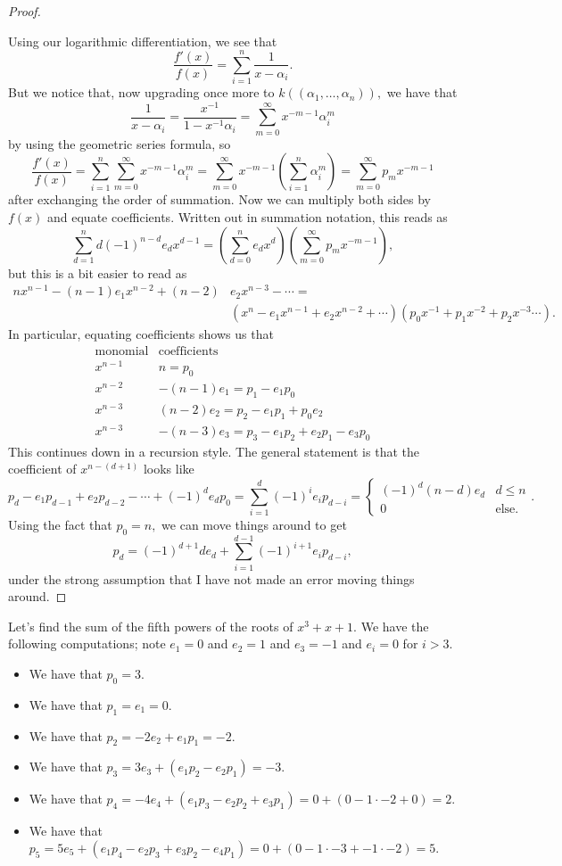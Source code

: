 \documentclass[../notes.tex]{subfiles}
\begin{document}
\begin{proof}
\begin{remark}
	\end{remark}
	Using our logarithmic differentiation, we see that
	\[\frac{f'(x)}{f(x)}=\sum_{i=1}^n\frac1{x-\alpha_i}.\]
	But we notice that, now upgrading once more to $k((\alpha_1,\ldots,\alpha_n)),$ we have that
	\[\frac1{x-\alpha_i}=\frac{x^{-1}}{1-x^{-1}\alpha_i}=\sum_{m=0}^\infty x^{-m-1}\alpha_i^m\]
	by using the geometric series formula, so
	\[\frac{f'(x)}{f(x)}=\sum_{i=1}^n\sum_{m=0}^\infty x^{-m-1}\alpha_i^m=\sum_{m=0}^\infty x^{-m-1}\left(\sum_{i=1}^n\alpha_i^m\right)=\sum_{m=0}^\infty p_mx^{-m-1}\]
	after exchanging the order of summation. Now we can multiply both sides by $f(x)$ and equate coefficients. Written out in summation notation, this reads as
	\[\sum_{d=1}^nd(-1)^{n-d}e_dx^{d-1}=\left(\sum_{d=0}^ne_dx^d\right)\left(\sum_{m=0}^\infty p_mx^{-m-1}\right),\]
	but this is a bit easier to read as
	\begin{align*}
		nx^{n-1}-(n-1)e_1x^{n-2}+(n-2)&e_2x^{n-3}-\cdots= \\
		&\left(x^n-e_1x^{n-1}+e_2x^{n-2}+\cdots\right)\left(p_0x^{-1}+p_1x^{-2}+p_2x^{-3}\cdots\right).
	\end{align*}
	In particular, equating coefficients shows us that
	\[\begin{array}{c|c}
		\text{monomial} & \text{coefficients} \\\hline
		x^{n-1} & n=p_0 \\
		x^{n-2} & -(n-1)e_1=p_1-e_1p_0 \\
		x^{n-3} & (n-2)e_2=p_2-e_1p_1+p_0e_2 \\
		x^{n-3} & -(n-3)e_3=p_3-e_1p_2+e_2p_1-e_3p_0
	\end{array}\]
	This continues down in a recursion style. The general statement is that the coefficient of $x^{n-(d+1)}$ looks like
	\[p_d-e_1p_{d-1}+e_2p_{d-2}-\cdots+(-1)^de_dp_0=\sum_{i=1}^d(-1)^ie_ip_{d-i}=\begin{cases}
		(-1)^d(n-d)e_d & d\le n \\
		0 & \text{else.}
	\end{cases}.\]
	Using the fact that $p_0=n,$ we can move things around to get
	\[\boxed{p_d=(-1)^{d+1}de_d+\sum_{i=1}^{d-1}(-1)^{i+1}e_ip_{d-i}},\]
	under the strong assumption that I have not made an error moving things around.
\end{proof}
\begin{example}
	Let's find the sum of the fifth powers of the roots of $x^3+x+1.$ We have the following computations; note $e_1=0$ and $e_2=1$ and $e_3=-1$ and $e_i=0$ for $i>3.$
	\begin{itemize}
		\item We have that $p_0=3.$
		\item We have that $p_1=e_1=0.$
		\item We have that $p_2=-2e_2+e_1p_1=-2.$
		\item We have that $p_3=3e_3+(e_1p_2-e_2p_1)=-3.$
		\item We have that $p_4=-4e_4+(e_1p_3-e_2p_2+e_3p_1)=0+(0-1\cdot-2+0)=2.$
		\item We have that $p_5=5e_5+(e_1p_4-e_2p_3+e_3p_2-e_4p_1)=0+(0-1\cdot-3+-1\cdot-2)=\boxed{5}.$
	\end{itemize}
\end{example}
\end{document}
